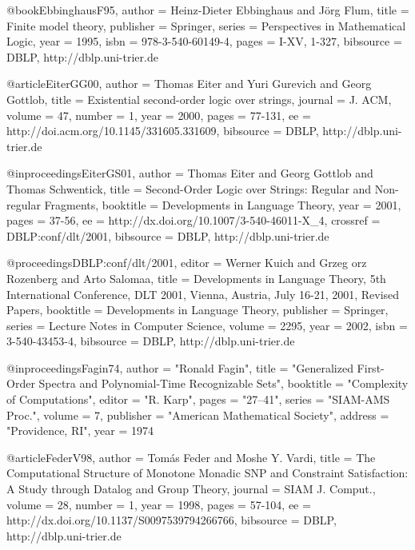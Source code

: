 \documentclass{article}
\begin{document}
@book{EbbinghausF95,
  author    = {Heinz-Dieter Ebbinghaus and
               J{\"o}rg Flum},
  title     = {Finite model theory},
  publisher = {Springer},
  series    = {Perspectives in Mathematical Logic},
  year      = {1995},
  isbn      = {978-3-540-60149-4},
  pages     = {I-XV, 1-327},
  bibsource = {DBLP, http://dblp.uni-trier.de}
}

@article{EiterGG00,
  author    = {Thomas Eiter and
               Yuri Gurevich and
               Georg Gottlob},
  title     = {Existential second-order logic over strings},
  journal   = {J. ACM},
  volume    = {47},
  number    = {1},
  year      = {2000},
  pages     = {77-131},
  ee        = {http://doi.acm.org/10.1145/331605.331609},
  bibsource = {DBLP, http://dblp.uni-trier.de}
}

@inproceedings{EiterGS01,
  author    = {Thomas Eiter and
               Georg Gottlob and
               Thomas Schwentick},
  title     = {Second-Order Logic over Strings: Regular and Non-regular
               Fragments},
  booktitle = {Developments in Language Theory},
  year      = {2001},
  pages     = {37-56},
  ee        = {http://dx.doi.org/10.1007/3-540-46011-X_4},
  crossref  = {DBLP:conf/dlt/2001},
  bibsource = {DBLP, http://dblp.uni-trier.de}
}

@proceedings{DBLP:conf/dlt/2001,
  editor    = {Werner Kuich and
               Grzeg	orz Rozenberg and
               Arto Salomaa},
  title     = {Developments in Language Theory, 5th International Conference,
               DLT 2001, Vienna, Austria, July 16-21, 2001, Revised Papers},
  booktitle = {Developments in Language Theory},
  publisher = {Springer},
  series    = {Lecture Notes in Computer Science},
  volume    = {2295},
  year      = {2002},
  isbn      = {3-540-43453-4},
  bibsource = {DBLP, http://dblp.uni-trier.de}
}


@inproceedings{Fagin74,
  author      = "Ronald Fagin", 
  title       = "Generalized First-Order Spectra and Polynomial-Time Recognizable Sets",
  booktitle   = "Complexity of Computations",
  editor      = "R. Karp",
  pages       = "27--41",
  series      = "SIAM-AMS Proc.", 
  volume      = 7,
  publisher   =	"American Mathematical Society",
  address     =	"Providence, RI",
  year        = 1974
}


@article{FederV98,
  author    = {Tom{\'a}s Feder and
               Moshe Y. Vardi},
  title     = {The Computational Structure of Monotone Monadic {SNP} and
               Constraint Satisfaction: A Study through Datalog and Group
               Theory},
  journal   = {SIAM J. Comput.},
  volume    = {28},
  number    = {1},
  year      = {1998},
  pages     = {57-104},
  ee        = {http://dx.doi.org/10.1137/S0097539794266766},
  bibsource = {DBLP, http://dblp.uni-trier.de}
}
\end{document}
